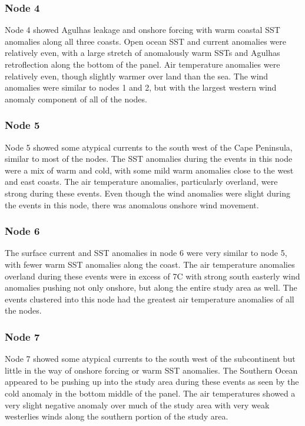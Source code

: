 \documentclass[a4paper,10pt,review]{elsarticle}
\begin{document}
\subsubsection{Node 4}
Node 4 showed Agulhas leakage and onshore forcing with warm coastal SST anomalies along all three coasts. Open ocean SST and current anomalies were relatively even, with a large stretch of anomalously warm SSTs and Agulhas retroflection along the bottom of the panel. Air temperature anomalies were relatively even, though slightly warmer over land than the sea. The wind anomalies were similar to nodes 1 and 2, but with the largest western wind anomaly component of all of the nodes.

\subsubsection{Node 5}
Node 5 showed some atypical currents to the south west of the Cape Peninsula, similar to most of the nodes. The SST anomalies during the events in this node were a mix of warm and cold, with some mild warm anomalies close to the west and east coasts. The air temperature anomalies, particularly overland, were strong during these events. Even though the wind anomalies were slight during the events in this node, there was anomalous onshore wind movement.

\subsubsection{Node 6}
The surface current and SST anomalies in node 6 were very similar to node 5, with fewer warm SST anomalies along the coast. The air temperature anomalies overland during these events were in excess of 7\degree C with strong south easterly wind anomalies pushing not only onshore, but along the entire study area as well. The events clustered into this node had the greatest air temperature anomalies of all the nodes.

\subsubsection{Node 7}
Node 7 showed some atypical currents to the south west of the subcontinent but little in the way of onshore forcing or warm SST anomalies. The Southern Ocean appeared to be pushing up into the study area during these events as seen by the cold anomaly in the bottom middle of the panel. The air temperatures showed a very slight negative anomaly over much of the study area with very weak westerlies winds along the southern portion of the study area.
\end{document}
